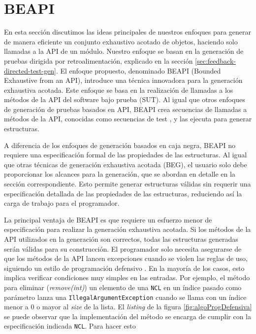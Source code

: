 \section[BEAPI]{BEAPI}
\label{sec:beapiIntro}

En esta sección discutimos las ideas principales de nuestros enfoques para generar de manera eficiente un conjunto exhaustivo acotado de objetos, haciendo solo llamadas a la API de un módulo. Nuestro enfoque se basan en la generación de pruebas dirigida por retroalimentación, explicado en la sección \ref{sec:feedback-directed-test-gen}.
El enfoque propuesto, denominado \textsf{BEAPI} (Bounded Exhaustive from an API), introduce una técnica innovadora para la generación exhaustiva acotada. Este enfoque se basa en la realización de llamadas a los métodos de la API del software bajo prueba (SUT). Al igual que otros enfoques de generación de pruebas basados en API, \textsf{BEAPI} crea secuencias de llamadas a métodos de la API, conocidas como secuencias de test \cite{Ammann16}, y las ejecuta para generar estructuras. 





A diferencia de los enfoques de generación basados en caja negra, \textsf{BEAPI} no requiere una especificación formal de las propiedades de las estructuras. Al igual que otras técnicas de generación exhaustiva acotada (BEG), el usuario solo debe proporcionar los alcances para la generación, que se abordan en detalle en la sección correspondiente.  Esto permite generar estructuras válidas sin requerir una especificación detallada de las propiedades de las estructuras, reduciendo así la carga de trabajo para el programador.

La principal ventaja de \textsf{BEAPI} es que requiere un esfuerzo menor de especificación para realizar la generación exhaustiva acotada. Si los métodos de la API utilizados en la generación son correctos, todas las estructuras generadas serán válidas para su construcción. El programador solo necesita asegurarse de que los métodos de la API lancen excepciones cuando se violen las reglas de uso, siguiendo un estilo de programación defensivo \cite{Liskov00}. En la mayoría de los casos, esto implica verificar condiciones muy simples en las entradas. Por ejemplo, el método para eliminar (\emph{remove(int)}) un elemento de una \texttt{NCL} en un índice pasado como parámetro lanza una \texttt{IllegalArgumentException} cuando se llama con un índice menor a 0 o mayor al \emph{size} de la lista. El \emph{listing} de la figura \ref{fig:algoProgDefensiva}  se puede observar que la implementación del método se encarga de cumplir con la especificación indicada \texttt{NCL}.
Para hacer esto



